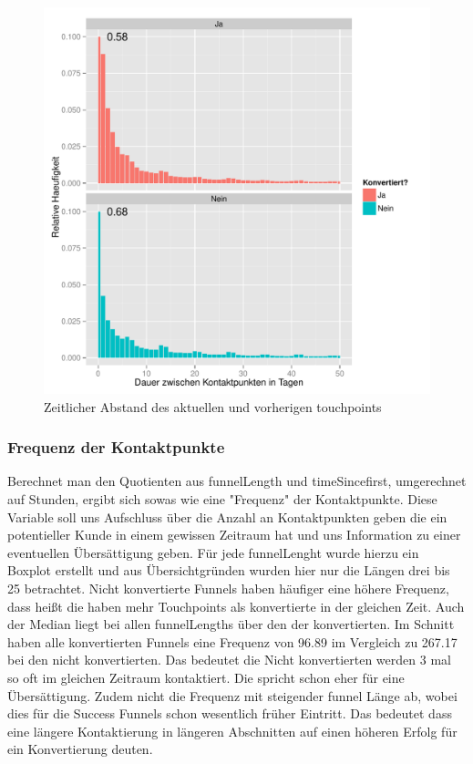 \begin{figure}[H]
    \centering
    \includegraphics[scale=0.5]{timeSinceLast.pdf}
    \caption{Zeitlicher Abstand des aktuellen und vorherigen touchpoints}
    \label{Fig_9}
\end{figure}


\subsubsection*{Frequenz der Kontaktpunkte}
Berechnet man den Quotienten aus funnelLength und timeSincefirst, umgerechnet auf Stunden, ergibt sich sowas wie eine "Frequenz" der Kontaktpunkte. Diese Variable soll uns Aufschluss über die Anzahl an Kontaktpunkten geben die ein potentieller Kunde in einem gewissen Zeitraum hat und uns Information zu einer eventuellen Übersättigung geben. Für jede funnelLenght wurde hierzu ein Boxplot erstellt und aus Übersichtgründen wurden hier nur die Längen drei bis 25 betrachtet. 
Nicht konvertierte Funnels haben häufiger eine höhere Frequenz, dass heißt die haben mehr Touchpoints als konvertierte in der gleichen Zeit. Auch der Median liegt bei allen funnelLengths über den der konvertierten. Im Schnitt haben alle konvertierten Funnels eine Frequenz von 96.89 im Vergleich zu 267.17 bei den nicht konvertierten. Das bedeutet die Nicht konvertierten werden 3 mal so oft im gleichen Zeitraum kontaktiert. Die spricht schon eher für eine Übersättigung. Zudem nicht die Frequenz mit steigender funnel Länge ab, wobei dies für die Success Funnels schon wesentlich früher Eintritt.
Das bedeutet  dass eine längere Kontaktierung in längeren Abschnitten auf einen höheren Erfolg für ein Konvertierung deuten.\\


